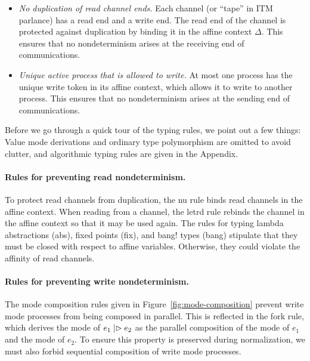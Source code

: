 \begin{itemize}[leftmargin=*]
\item \emph{No duplication of read channel ends.} Each channel (or ``tape'' in
  ITM parlance) has a read end and a write end. The read end of the channel is
  protected against duplication by binding it in the affine context $\Delta$. This
  ensures that no nondeterminism arises at the receiving end of communications.

\item \emph{Unique active process that is allowed to write.} At most one process has the unique write token in its affine context, which
  allows it to write to another process. This ensures that no nondeterminism
  arises at the sending end of communications.
\end{itemize}

\begin{comment}
To summarize, it maintains these invariants to ensure that \emph{well-typed ILC
programs are expressible as ITMs}:
\begin{itemize}[leftmargin=*]
  \item No duplication of read channel ends.
  \item No parallel composition of write mode processes.
\end{itemize}
\end{comment}

Before we go through a quick tour of the typing rules, we point out a few
things: Value mode derivations and ordinary type polymorphism are omitted to
avoid clutter, and algorithmic typing rules are given in the
Appendix.

\paragraph{Rules for preventing read nondeterminism.}
To protect read channels from duplication, the nu rule binds read channels in
the affine context. When reading from a channel, the letrd rule rebinds the
channel in the affine context so that it may be used again. The rules for typing
lambda abstractions (abs), fixed points (fix), and bang! types (bang) stipulate
that they must be closed with respect to affine variables. Otherwise, they could
violate the affinity of read channels.\smallskip

\paragraph{Rules for preventing write nondeterminism.}
The mode composition rules given in Figure~\ref{fig:mode-composition} prevent
write mode processes from being composed in parallel. This is reflected in the
fork rule, which derives the mode of $e_1 \mathrel{|\rhd} e_2$ as the parallel
composition of the mode of $e_1$ and the mode of $e_2$.
To ensure this property is preserved during normalization, we must also forbid
sequential composition of write mode processes.

